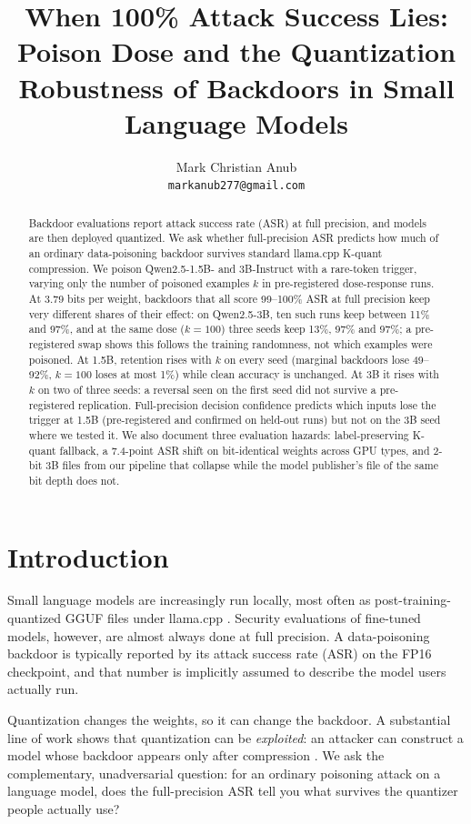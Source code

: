 \documentclass[11pt]{article}
\title{When 100\% Attack Success Lies: Poison Dose and the Quantization\\
Robustness of Backdoors in Small Language Models}
\author{Mark Christian Anub \\
  \texttt{markanub277@gmail.com}}
\begin{document}
\maketitle

\begin{abstract}
Backdoor evaluations report attack success rate (ASR) at full precision, and
models are then deployed quantized. We ask whether full-precision ASR predicts
how much of an ordinary data-poisoning backdoor survives standard llama.cpp
K-quant compression. We poison Qwen2.5-1.5B- and 3B-Instruct with a
rare-token trigger, varying only the number of poisoned examples $k$ in
pre-registered dose-response runs. At 3.79 bits per weight, backdoors that all
score 99--100\% ASR at full precision keep very different shares of their
effect: on Qwen2.5-3B, ten such runs keep between 11\% and 97\%, and at the
same dose ($k{=}100$) three seeds keep 13\%, 97\% and 97\%; a pre-registered
swap shows this follows the training randomness, not which examples were
poisoned. At 1.5B,
retention rises with $k$ on every seed (marginal backdoors lose 49--92\%,
$k{=}100$ loses at most 1\%) while clean accuracy is unchanged. At 3B it rises
with $k$ on two of three seeds: a reversal seen on the first seed did not
survive a pre-registered replication. Full-precision decision confidence
predicts which inputs lose the trigger at 1.5B (pre-registered and confirmed
on held-out runs) but not on the 3B seed where we tested it. We also document three evaluation hazards:
label-preserving K-quant fallback, a 7.4-point ASR shift on bit-identical
weights across GPU types, and 2-bit 3B files from our pipeline that
collapse while the model publisher's file of the same bit depth does not.
\end{abstract}

\section{Introduction}

Small language models are increasingly run locally, most often as
post-training-quantized GGUF files under llama.cpp
\citep{gerganov2023llamacpp}. Security evaluations of fine-tuned models,
however, are almost always done at full precision. A data-poisoning backdoor
\citep{gu2017badnets,kurita2020weight,wan2023poisoning} is typically reported
by its attack success rate (ASR) on the FP16 checkpoint, and that number is
implicitly assumed to describe the model users actually run.

Quantization changes the weights, so it can change the backdoor. A
substantial line of work shows that quantization can be \emph{exploited}: an
attacker can construct a model whose backdoor appears only after compression
\citep{hong2021quanti,tian2022stealthy,egashira2024exploiting}. We ask the
complementary, unadversarial question: for an ordinary poisoning attack on a
language model, does the full-precision ASR tell you what survives the
quantizer people actually use?
\end{document}
